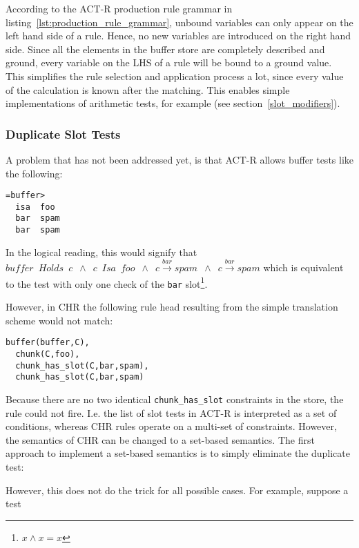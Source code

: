 According to the ACT-R production rule grammar in listing~\ref{lst:production_rule_grammar}, unbound variables can only appear on the left hand side of a rule. Hence, no new variables are introduced on the right hand side. Since all the elements in the buffer store are completely described and ground, every variable on the LHS of a rule will be bound to a ground value. This simplifies the rule selection and application process a lot, since every value of the calculation is known after the matching. This enables simple implementations of arithmetic tests, for example (see section~\ref{slot_modifiers}).

\subsubsection{Duplicate Slot Tests}
\label{implementation:duplicate_slot_tests}

A problem that has not been addressed yet, is that ACT-R allows buffer tests like the following:

\begin{lstlisting}
=buffer>
  isa  foo
  bar  spam
  bar  spam
\end{lstlisting}

In the logical reading, this would signify that $buffer \enspace Holds \enspace c \enspace \wedge \enspace c \enspace Isa \enspace foo \enspace \wedge \enspace c \xrightarrow{bar} spam \enspace \wedge \enspace c \xrightarrow{bar} spam$ which is equivalent to the test with only one check of the \lstinline|bar| slot\footnote{$x \wedge x = x$}.

However, in CHR the following rule head resulting from the simple translation scheme would not match:

\begin{lstlisting}
buffer(buffer,C),
  chunk(C,foo),
  chunk_has_slot(C,bar,spam),
  chunk_has_slot(C,bar,spam)
\end{lstlisting}

Because there are no two identical \lstinline|chunk_has_slot| constraints in the store, the rule could not fire. I.e. the list of slot tests in ACT-R is interpreted as a set of conditions, whereas CHR rules operate on a multi-set of constraints. However, the semantics of CHR can be changed to a set-based semantics. The first approach to implement a set-based semantics is to simply eliminate the duplicate test:

However, this does not do the trick for all possible cases. For example, suppose a test

